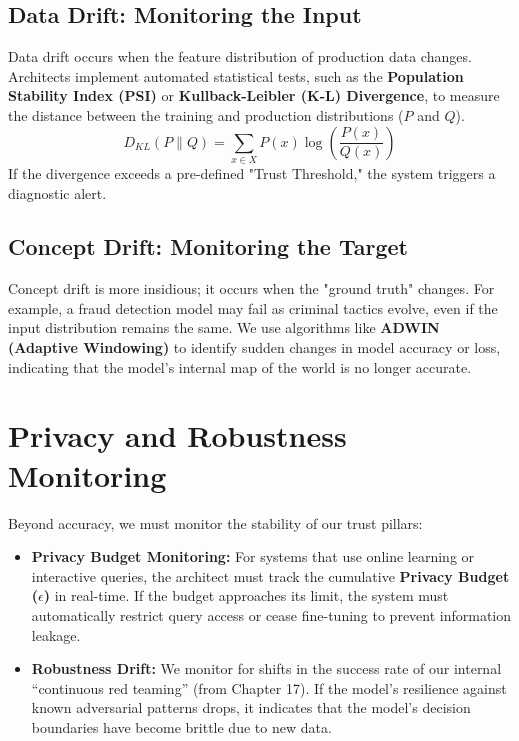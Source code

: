 \subsection{Data Drift: Monitoring the Input}
Data drift occurs when the feature distribution of production data changes. Architects implement automated statistical tests, such as the \textbf{Population Stability Index (PSI)} or \textbf{Kullback-Leibler (K-L) Divergence}, to measure the distance between the training and production distributions ($P$ and $Q$).
\begin{equation}
D_{KL}(P \| Q) = \sum_{x \in X} P(x) \log\left(\frac{P(x)}{Q(x)}\right)
\end{equation}
If the divergence exceeds a pre-defined "Trust Threshold," the system triggers a diagnostic alert.

\subsection{Concept Drift: Monitoring the Target}
Concept drift is more insidious; it occurs when the "ground truth" changes. For example, a fraud detection model may fail as criminal tactics evolve, even if the input distribution remains the same. We use algorithms like \textbf{ADWIN (Adaptive Windowing)} to identify sudden changes in model accuracy or loss, indicating that the model's internal map of the world is no longer accurate.

\section{Privacy and Robustness Monitoring}
\label{sec:privacy_monitoring}

Beyond accuracy, we must monitor the stability of our trust pillars:

\begin{itemize}
    \item \textbf{Privacy Budget Monitoring:} For systems that use online learning or interactive queries, the architect must track the cumulative \textbf{Privacy Budget ($\epsilon$)} in real-time. If the budget approaches its limit, the system must automatically restrict query access or cease fine-tuning to prevent information leakage.
    \item \textbf{Robustness Drift:} We monitor for shifts in the success rate of our internal ``continuous red teaming'' (from Chapter 17). If the model's resilience against known adversarial patterns drops, it indicates that the model's decision boundaries have become brittle due to new data.
\end{itemize}

